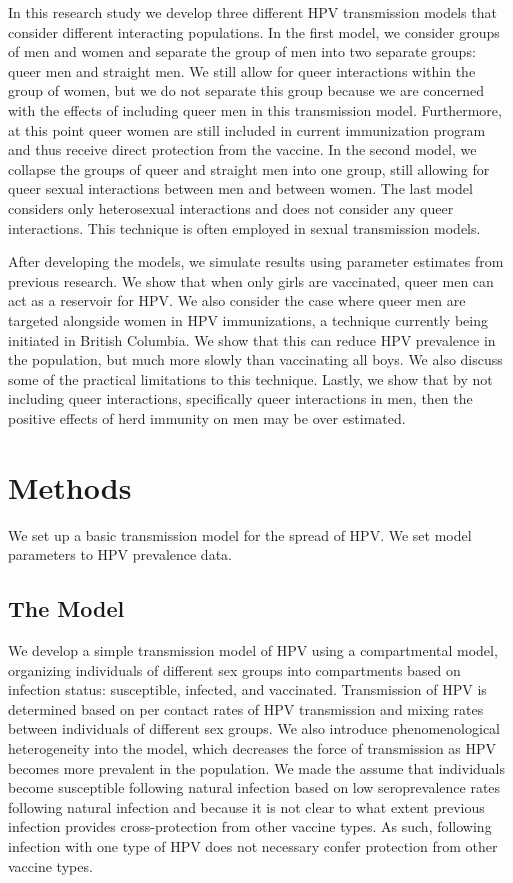 \documentclass[12pt]{article}
\begin{document}
In this research study we develop three different HPV transmission models that consider different interacting populations.  In the first model, we consider groups of men and women and separate the group of men into two separate groups: queer men and straight men.  We still allow for queer interactions within the group of women, but we do not separate this group because we are concerned with the effects of including queer men in this transmission model.  Furthermore, at this point queer women are still included in current immunization program and thus receive direct protection from the vaccine. In the second model, we collapse the groups of queer and straight men into one group, still allowing for queer sexual interactions between men and between women.  The last model considers only heterosexual interactions and does not consider any queer interactions.  This technique is often employed in sexual transmission models.

After developing the models, we simulate results using parameter estimates from previous research.  We show that when only girls are vaccinated, queer men can act as a reservoir for HPV.  We also consider the case where queer men are targeted alongside women in HPV immunizations, a technique currently being initiated in British Columbia.  We show that this can reduce HPV prevalence in the population, but much more slowly than vaccinating all boys.  We also discuss some of the practical limitations to this technique.  Lastly, we show that by not including queer interactions, specifically queer interactions in men, then the positive effects of herd immunity on men may be over estimated. 

\section{Methods}
We set up a basic transmission model for the spread of HPV. We set model parameters to HPV prevalence data.  

\subsection{The Model}
We develop a simple transmission model of HPV using a compartmental model, organizing individuals of different sex groups into compartments based on infection status: susceptible, infected, and vaccinated.  Transmission of HPV is determined based on per contact rates of HPV transmission and mixing rates between individuals of different sex groups.  We also introduce phenomenological heterogeneity into the model, which decreases the force of transmission as HPV becomes more prevalent in the population.  We made the assume that individuals become susceptible following natural infection based on low seroprevalence rates following natural infection and because it is not clear to what extent previous infection provides cross-protection from other vaccine types.  As such, following infection with one type of HPV does not necessary confer protection from other vaccine types.  
\end{document}

